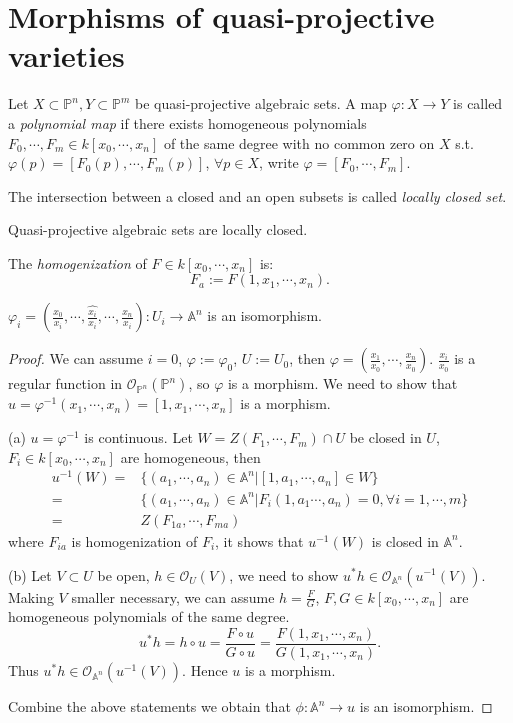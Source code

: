 \section{Morphisms of quasi-projective varieties}
\begin{definition}
	Let $ X\subset \mathbb{P}^n,Y\subset \mathbb{P}^m $ be quasi-projective algebraic sets. A map $ \varphi:X\to Y $ is called a \textit{polynomial map} if there exists homogeneous polynomials $ F_0,\cdots,F_m\in k[x_0,\cdots,x_n] $ of the same degree with no common zero on $ X $ s.t.
	$ \varphi(p)=[F_0(p),\cdots,F_m(p)] $, $ \forall p\in X $, write $ \varphi=[F_0,\cdots,F_m] $.
\end{definition}
\begin{definition}
	The intersection between a closed and an open subsets is called  \textit{locally closed set}.
\end{definition}
Quasi-projective algebraic sets are locally closed.
\begin{definition}
	The \textit{homogenization} of $ F\in k[x_0,\cdots,x_n] $ is:
	$$
		F_a:=F(1,x_1,\cdots,x_n).
	$$
\end{definition}
\begin{theorem}\label{13}
	$ \varphi_i=(\frac{x_0}{x_i},\cdots,\hat{\frac{x_i}{x_i}},\cdots,\frac{x_n}{x_i}):U_i\to \mathbb{A}^n $ is an isomorphism.
\end{theorem}
\begin{proof}
	We can assume $ i=0 $, $ \varphi:=\varphi_0 $, $ U:=U_0 $, then $ \varphi=(\frac{x_1}{x_0},\cdots,\frac{x_n}{x_0}) $. $ \frac{x_i}{x_0} $ is a regular function in $ \mathcal{O}_{\mathbb{P}^n}(\mathbb{P}^n) $, so $ \varphi $ is a morphism. We need to show that $ u=\varphi^{-1}(x_1,\cdots,x_n)=[1,x_1,\cdots,x_n] $ is a morphism.

	(a) $ u=\varphi^{-1} $ is continuous. Let $ W=Z(F_1,\cdots,F_m)\cap U $ be closed in $ U $, $ F_i\in k[x_0,\cdots,x_n] $ are homogeneous, then
	\begin{align*}
		u^{-1}(W)= & \{ (a_1,\cdots,a_n)\in \mathbb{A}^n|[1,a_1,\cdots,a_n]\in W \}                      \\
		=          & \{ (a_1,\cdots,a_n)\in \mathbb{A}^n|F_i(1,a_1\cdots,a_n)=0, \forall i=1,\cdots,m \} \\
		=          & Z(F_{1a},\cdots,F_{ma})
	\end{align*}
	where $ F_{ia} $ is homogenization of $ F_i $, it shows that $ u^{-1}(W) $ is closed in $ \mathbb{A}^n  $.

	(b) Let $ V\subset U $ be open, $ h\in \mathcal{O}_U(V) $, we need to show $ u^\ast h\in \mathcal{O}_{\mathbb{A}^n}(u^{-1}(V)) $. Making $ V $ smaller necessary, we can assume $ h=\frac{F}{G} $, $ F,G \in k[x_0,\cdots,x_n]$ are homogeneous polynomials of the same degree.
	$$
		u^\ast h = h\circ u=\frac{F\circ u}{G\circ u}=\frac{F(1,x_1,\cdots,x_n)}{G(1,x_1,\cdots,x_n)}.
	$$
	Thus $ u^\ast h\in \mathcal{O}_{\mathbb{A}^n}(u^{-1}(V)) $. Hence $u$ is a morphism.

	Combine the above statements we obtain that $ \phi:\mathbb{A}^n\to u $ is an isomorphism.
\end{proof}
